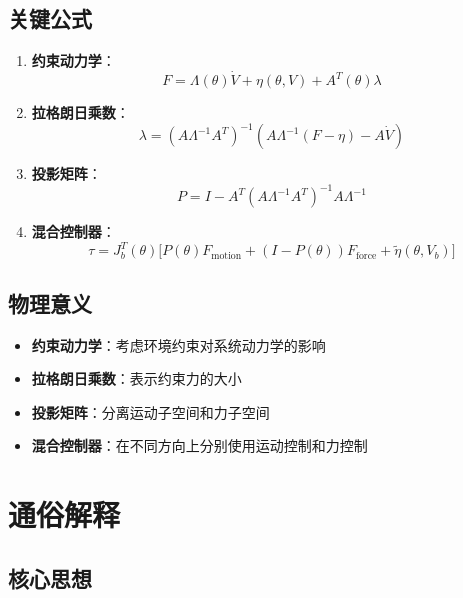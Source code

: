 \documentclass[12pt,a4paper]{article}
\begin{document}
\subsection{关键公式}

\begin{enumerate}
\item \textbf{约束动力学}：
\begin{equation}
F = \Lambda(\theta)\dot{V} + \eta(\theta, V) + A^T(\theta)\lambda
\end{equation}

\item \textbf{拉格朗日乘数}：
\begin{equation}
\lambda = (A\Lambda^{-1}A^T)^{-1}(A\Lambda^{-1}(F - \eta) - A\dot{V})
\end{equation}

\item \textbf{投影矩阵}：
\begin{equation}
P = I - A^T(A\Lambda^{-1}A^T)^{-1}A\Lambda^{-1}
\end{equation}

\item \textbf{混合控制器}：
\begin{equation}
\tau = J_b^T(\theta)\Bigg[P(\theta)F_{\text{motion}} + (I - P(\theta))F_{\text{force}} + \tilde{\eta}(\theta, V_b)\Bigg]
\end{equation}
\end{enumerate}

\subsection{物理意义}

\begin{itemize}
\item \textbf{约束动力学}：考虑环境约束对系统动力学的影响
\item \textbf{拉格朗日乘数}：表示约束力的大小
\item \textbf{投影矩阵}：分离运动子空间和力子空间
\item \textbf{混合控制器}：在不同方向上分别使用运动控制和力控制
\end{itemize}

\section{通俗解释}

\subsection{核心思想}
\end{document}
